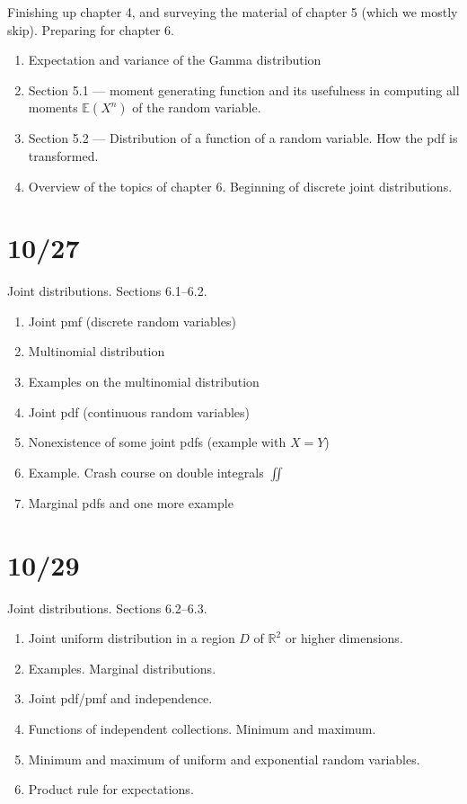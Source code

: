 \documentclass[letterpaper,11pt,oneside,reqno]{amsart}
\numberwithin{equation}{section}
\theoremstyle{definition}
\begin{document}
Finishing up chapter 4, and surveying the material of chapter 5 (which we mostly skip).
Preparing for chapter 6.

\begin{enumerate}
	\item Expectation and variance of the Gamma distribution
	\item Section 5.1 --- moment generating function and its usefulness in computing all 
		moments $\mathbb{E}(X^n)$ of the 
		random variable.
	\item Section 5.2 --- Distribution of a function of a random variable. How the pdf is transformed.
	\item Overview of the topics of chapter 6.
		Beginning of discrete joint distributions.
\end{enumerate}

\section{10/27}

Joint distributions. Sections 6.1--6.2.
\begin{enumerate}
	\item Joint pmf (discrete random variables)
	\item Multinomial distribution
	\item Examples on the multinomial distribution
	\item Joint pdf (continuous random variables)
	\item Nonexistence of some joint pdfs (example with $X=Y$)
	\item Example. Crash course on double integrals $\iint$
	\item Marginal pdfs and one more example
\end{enumerate}

\section{10/29}

Joint distributions. Sections 6.2--6.3.
\begin{enumerate}
	\item Joint uniform distribution in a region $D$ of $\mathbb{R}^2$ or higher dimensions.
	\item 
		Examples. Marginal distributions.
	\item Joint pdf/pmf and independence.
	\item Functions of independent collections. Minimum and maximum.
	\item Minimum and maximum of uniform and exponential random variables.
	\item Product rule for expectations.
\end{enumerate}
\end{document}
